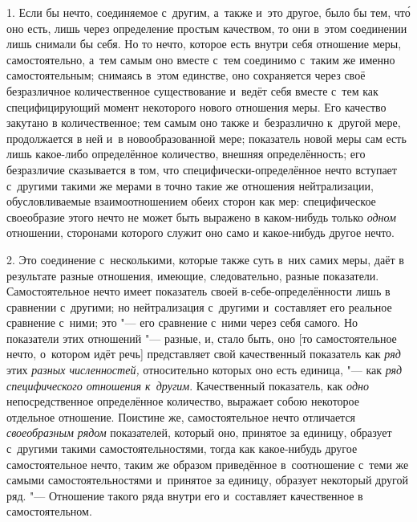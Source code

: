 1. Если бы нечто, соединяемое с~другим, а~также и~это другое, было бы тем,
чт\'{о} оно есть, лишь через определение простым качеством, то они в~этом
соединении лишь снимали бы себя. Но то нечто, которое есть внутри себя
отношение меры, самостоятельно, а~тем самым оно вместе с~тем соединимо с~таким
же именно самостоятельным; снимаясь в~этом единстве, оно сохраняется через своё
безразличное количественное существование и~ведёт себя вместе с~тем как
специфицирующий момент некоторого нового отношения меры. Его качество закутано
в количественное; тем самым оно также и~безразлично к~другой мере, продолжается
в ней и~в новообразованной мере; показатель новой меры сам есть лишь какое-либо
определённое количество, внешняя определённость; его безразличие сказывается в
том, что специфически-определённое нечто вступает с~другими такими же мерами в
точно такие же отношения нейтрализации, обусловливаемые взаимоотношением обеих
сторон как мер: специфическое своеобразие этого нечто не может быть выражено в
каком-нибудь только {\em одном} отношении, сторонами которого служит оно само и
какое-нибудь другое нечто.

2. Это соединение с~несколькими, которые также суть в~них самих меры, даёт в
результате разные отношения, имеющие, следовательно, разные показатели.
Самостоятельное нечто имеет показатель своей в-себе-определённости лишь в
сравнении с~другими; но нейтрализация с~другими и~составляет его реальное
сравнение с~ними; это "--- его сравнение с~ними через себя самого. Но
показатели этих отношений "--- разные, и, стало быть, оно [то самостоятельное
нечто, о~котором идёт речь] представляет свой качественный показатель как
{\em ряд} этих {\em разных численностей,} относительно которых оно есть
единица, "--- как {\em ряд специфического отношения к~другим}. Качественный
показатель, как {\em одно} непосредственное определённое количество, выражает
собою некоторое отдельное отношение. Поистине же, самостоятельное нечто
отличается {\em своеобразным рядом} показателей, который оно, принятое за
единицу, образует с~другими такими самостоятельностями, тогда как какое-нибудь
другое самостоятельное нечто, таким же образом приведённое в~соотношение с~теми
же самыми самостоятельностями и~принятое за единицу, образует некоторый другой
ряд. "--- Отношение такого ряда внутри его и~составляет качественное в
самостоятельном.

